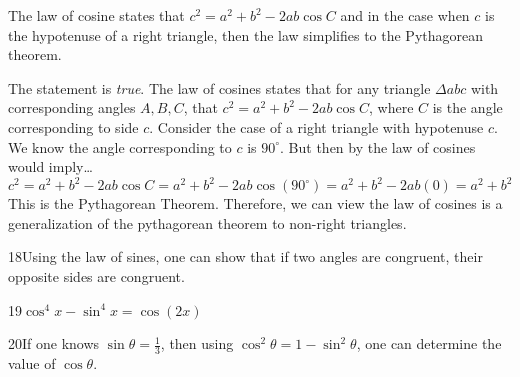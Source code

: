 \documentclass[11pt,letterpaper]{article}
\begin{document}
 The law of cosine states that $c^2= a^2 + b^2 - 2ab \cos C$ and in the case when $c$ is the hypotenuse of a right triangle, then the law simplifies to the Pythagorean theorem. \pspace

\sol The statement is \textit{true}. The law of cosines states that for any triangle $\Delta abc$ with corresponding angles $A, B, C$, that $c^2= a^2 + b^2 - 2ab \cos C$, where $C$ is the angle corresponding to side $c$. Consider the case of a right triangle with hypotenuse $c$. We know the angle corresponding to $c$ is $90^\circ$. But then by the law of cosines would imply\dots
	\[
	c^2= a^2 + b^2 - 2ab \cos C= a^2 + b^2 - 2ab \cos(90^\circ)= a^2 + b^2 - 2ab(0)= a^2 + b^2
	\]
This is the Pythagorean Theorem. Therefore, we can view the law of cosines is a generalization of the pythagorean theorem to non-right triangles. \pvspace{1.3cm}


18Using the law of sines, one can show that if two angles are congruent, their opposite sides are congruent. 

19$\cos^4 x - \sin^4 x= \cos(2x)$

20If one knows $\sin \theta= \frac{1}{3}$, then using $\cos^2 \theta= 1 - \sin^2 \theta$, one can determine the value of $\cos \theta$.
\end{document}
